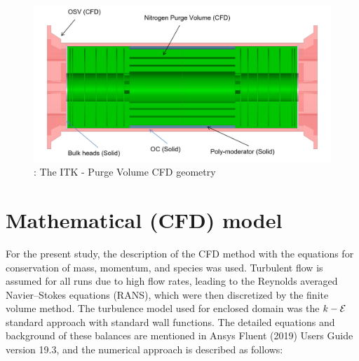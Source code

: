 \documentclass[a4paper]{jpconf}
\begin{document}
\begin{figure}[!h]
\begin{center}
  \includegraphics[width=0.60\linewidth]{geometryITK.png}
  \caption{: The ITK - Purge Volume CFD geometry} 
  \label{fig2} 
	\end{center}
\end{figure}



\section{Mathematical (CFD) model}

For the present study, the description of the CFD method with the equations for conservation of mass, momentum,
and species was used. Turbulent flow is assumed for all runs due to high flow rates, leading to the Reynolds averaged
Navier–Stokes equations (RANS), which were then discretized by the finite volume method. The turbulence
model used for enclosed domain was the $k-{\cal E}$ standard approach with standard wall functions. The detailed
equations and background of these balances are mentioned in Ansys Fluent (2019) Users Guide version 19.3, and the
numerical approach is described as follows:
\end{document}
